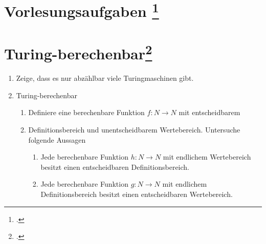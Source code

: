 \documentclass{bschlangaul-aufgabe}
\begin{document}
\section{Vorlesungsaufgaben
\footcite{theo:fs:4}}

\section{Turing-berechenbar\footcite[Seite 29]{theo:fs:4}}

\begin{enumerate}
\item Zeige, dass es nur abzählbar viele Turingmaschinen gibt.

\item Turing-berechenbar

\begin{enumerate}
\item Definiere eine berechenbare Funktion $f: N \rightarrow N$ mit
entscheidbarem

\item Definitionsbereich und unentscheidbarem Wertebereich. Untersuche
folgende Aussagen

\begin{enumerate}

\item Jede berechenbare Funktion $h: N \rightarrow N$ mit endlichem
Wertebereich besitzt einen entscheidbaren Definitionsbereich.

\item Jede berechenbare Funktion $g: N \rightarrow N$ mit endlichem
Definitionsbereich besitzt einen entscheidbaren Wertebereich.
\end{enumerate}
\end{enumerate}
\end{enumerate}
\end{document}
